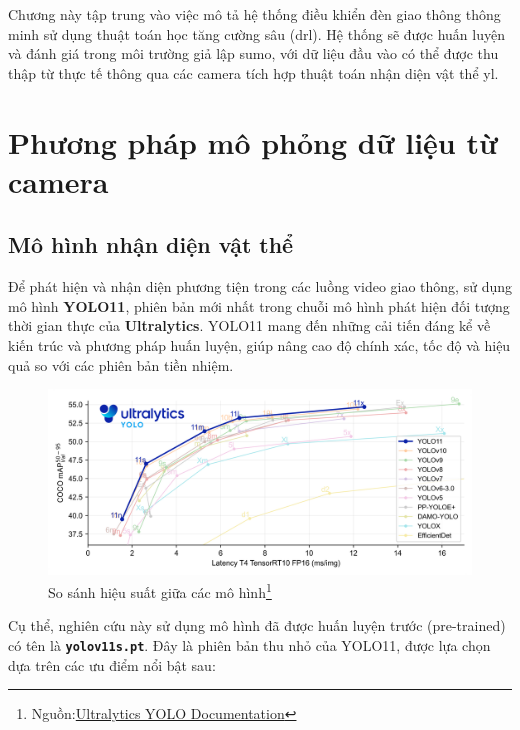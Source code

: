 Chương này tập trung vào việc mô tả hệ thống điều khiển đèn giao thông thông minh sử dụng thuật toán học tăng cường sâu (\ac{drl}). Hệ thống sẽ được huấn luyện và đánh giá trong môi trường giả lập \ac{sumo}, với dữ liệu đầu vào có thể được thu thập từ thực tế thông qua các camera tích hợp thuật toán nhận diện vật thể \ac{yl}.

\section{Phương pháp mô phỏng dữ liệu từ camera}
\subsection{Mô hình nhận diện vật thể}
Để phát hiện và nhận diện phương tiện trong các luồng video giao thông, sử dụng mô hình \textbf{YOLO11}, phiên bản mới nhất trong chuỗi mô hình phát hiện đối tượng thời gian thực của \textbf{Ultralytics}. YOLO11 mang đến những cải tiến đáng kể về kiến trúc và phương pháp huấn luyện, giúp nâng cao độ chính xác, tốc độ và hiệu quả so với các phiên bản tiền nhiệm.

\begin{figure}[!htp]
    \centering
    \includegraphics[width=\textwidth]{img/yolo_models}
    \caption{So sánh hiệu suất giữa các mô hình\footnote{Nguồn:\href{https://docs.ultralytics.com/models/yolo11}{Ultralytics YOLO Documentation}}}
    \label{fig:yolo_models}
\end{figure}
Cụ thể, nghiên cứu này sử dụng mô hình đã được huấn luyện trước (pre-trained) có tên là \textbf{\texttt{yolov11s.pt}}. Đây là phiên bản thu nhỏ của YOLO11, được lựa chọn dựa trên các ưu điểm nổi bật sau:

